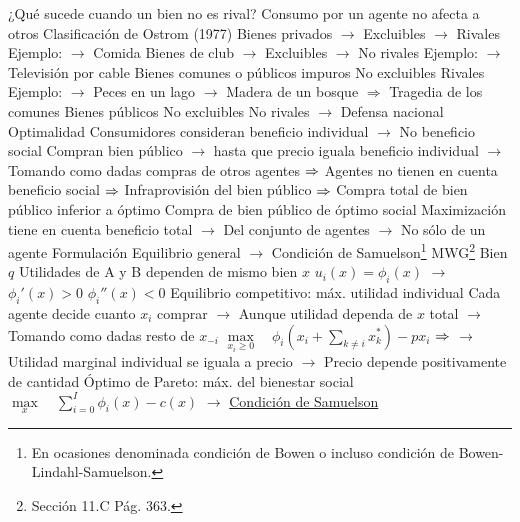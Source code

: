\documentclass{nuevotema}
\begin{document}
\begin{esquemal}
				\4 ¿Qué sucede cuando un bien no es rival?
				\4[$\Rightarrow$] Consumo por un agente no afecta a otros
			\3 Clasificación de Ostrom (1977)
				\4[] 
				\4 Bienes privados
				\4[] $\to$ Excluibles
				\4[] $\to$ Rivales
				\4[] Ejemplo:
				\4[] $\to$ Comida
				\4 Bienes de club
				\4[] $\to$ Excluibles
				\4[] $\to$ No rivales
				\4[] Ejemplo:
				\4[] $\to$ Televisión por cable
				\4 Bienes comunes o públicos impuros
				\4[] No excluibles
				\4[] Rivales
				\4[] Ejemplo:
				\4[] $\to$ Peces en un lago
				\4[] $\to$ Madera de un bosque
				\4[] $\Rightarrow$ Tragedia de los comunes
				\4 Bienes públicos
				\4[] No excluibles
				\4[] No rivales
				\4[] $\to$ Defensa nacional
			\3 Optimalidad
				\4 Consumidores consideran beneficio individual
				\4[] $\to$ No beneficio social
				\4[] Compran bien público
				\4[] $\to$ hasta que precio iguala beneficio individual
				\4[] $\to$ Tomando como dadas compras de otros agentes
				\4[] $\Rightarrow$ Agentes no tienen en cuenta beneficio social
				\4[] $\Rightarrow$ Infraprovisión del bien público
				\4[] $\Rightarrow$ Compra total de bien público inferior a óptimo
				\4 Compra de bien público de óptimo social
				\4[] Maximización tiene en cuenta beneficio total
				\4[] $\to$ Del conjunto de agentes
				\4[] $\to$ No sólo de un agente
		\2 Formulación
			\3 Equilibrio general
				\4[] $\to$ Condición de Samuelson\footnote{En ocasiones denominada condición de Bowen o incluso condición de Bowen-Lindahl-Samuelson.}
				\4 
				\4[] 
			\3 MWG\footnote{Sección 11.C Pág. 363.}
				\4 Bien $q$
				\4 Utilidades de A y B dependen de mismo bien $x$
				\4[] $u_i(x) = \phi_i(x)$
				\4[] $\to$ $\phi_i'(x) > 0$ \quad $\phi_i''(x) < 0$
				\4 Equilibrio competitivo: máx. utilidad individual
				\4[] Cada agente decide cuanto $x_i$ comprar
				\4[] $\to$ Aunque utilidad dependa de $x$ total
				\4[] $\to$ Tomando como dadas resto de $x_{-i}$
				\4[] $\underset{x_i\geq 0}{\max} \quad \phi_i \left( x_i + \sum_{k\neq i} x_k^* \right) - p x_i$
				\4[] $\Rightarrow$ 
				\4[] $\to$ Utilidad marginal individual se iguala a precio
				\4[] $\to$ Precio depende positivamente de cantidad
				\4 Óptimo de Pareto: máx. del bienestar social
				\4[] $\underset{x}{\max} \quad \sum_{i=0}^I \phi_i (x) - c(x)$
				\4[] 
				\4[] $\to$ \underline{Condición de Samuelson}

\end{esquemal}
\end{document}
